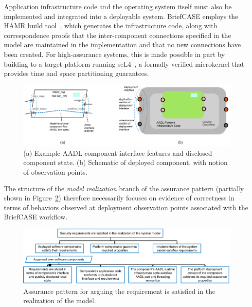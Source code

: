 Application infrastructure code and the operating system itself must also be implemented and integrated into a deployable system.  BriefCASE employs the HAMR build tool~\cite{hamr}, which generates the infrastructure code, along with correspondence proofs that the inter-component connections specified in the model are maintained in the implementation and that no new connections have been created.  For high-assurance systems, this is made possible in part by building to a target platform running seL4~\cite{sel4-cacm18}, a formally verified microkernel that provides time and space partitioning guarantees.


\begin{figure}[h] 
	\centering 
	\includegraphics[width=\textwidth]{figs/deployment-interface.png}
	\caption{(a) Example AADL component interface features and disclosed component state. (b) Schematic of deployed component, with notion of observation points.}
	\label{fig:deployment-interface} 
\end{figure}

The structure of the \textit{model realization} branch of the assurance pattern (partially shown in Figure~\ref{fig:req-satisfied-in-model-realization}) therefore necessarily focuses on evidence of correctness in terms of behaviors observed at deployment observation points associated with the BriefCASE workflow.  


\begin{figure}[h] 
	\centering 
	\includegraphics[width=\textwidth]{figs/req-satisfied-in-model-realization.png}
	\caption{Assurance pattern for arguing the requirement is satisfied in the realization of the model.}
	\label{fig:req-satisfied-in-model-realization} 
\end{figure}

